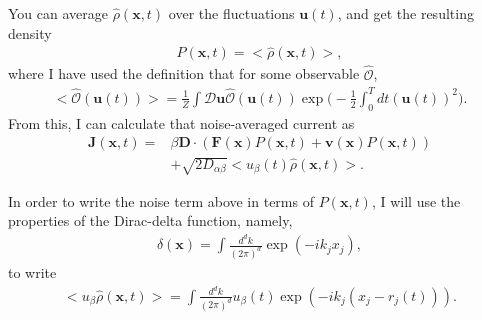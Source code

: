 \documentclass[twocolumn,amsmath,amssymb,aps]{revtex4-1}%
\begin{document}
You can average $\hat{\rho}(\bm{x},t)$ over the fluctuations $\bm{u}(t)$, and
get the resulting density
\begin{align}
  P(\bm{x},t)=<\hat{\rho}(\bm{x},t)>,
\end{align}
where I have used the definition that for some observable $\hat{\mathcal{O}}$,
\begin{align}
  <\hat{\mathcal{O}}(\bm{u}(t))>=\frac{1}{Z}\int\mathcal{D}\bm{u}
  \hat{\mathcal{O}}(\bm{u}(t))
  \exp\bigg(-\frac{1}{2}\int_0^Tdt(\bm{u}(t))^2\bigg).
\end{align}
From this, I can calculate that noise-averaged current as
\begin{align}
  \bm{J}(\bm{x},t)=
  &\beta\bm{D}\cdot(\bm{F}(\bm{x})P(\bm{x},t)
  +\bm{v}(\bm{x})P(\bm{x},t))\nonumber\\
  &+\sqrt{2D_{\alpha\beta}}<u_{\beta}(t)\hat{\rho}(\bm{x},t)>.
\end{align}

In order to write the noise term above in terms of $P(\bm{x},t)$, I will use
the properties of the Dirac-delta function, namely,
\begin{align}
  \delta(\bm{x})=\int\frac{d^dk}{(2\pi)^d}\exp(-ik_jx_j),
\end{align}
to write
\begin{align}
  <u_{\beta}\hat{\rho}(\bm{x},t)>=\int\frac{d^dk}{(2\pi)^d}u_{\beta}(t)
  \exp(-ik_j(x_j-r_j(t))).
\end{align}
\end{document}
